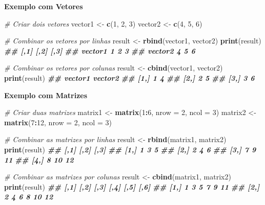 \documentclass[
]{book}
\newenvironment{Shaded}{\begin{snugshade}}{\end{snugshade}}
\newcommand{\AttributeTok}[1]{\textcolor[rgb]{0.13,0.29,0.53}{#1}}
\newcommand{\CommentTok}[1]{\textcolor[rgb]{0.56,0.35,0.01}{\textit{#1}}}
\newcommand{\DecValTok}[1]{\textcolor[rgb]{0.00,0.00,0.81}{#1}}
\newcommand{\DocumentationTok}[1]{\textcolor[rgb]{0.56,0.35,0.01}{\textbf{\textit{#1}}}}
\newcommand{\FunctionTok}[1]{\textcolor[rgb]{0.13,0.29,0.53}{\textbf{#1}}}
\newcommand{\NormalTok}[1]{#1}
\newcommand{\OtherTok}[1]{\textcolor[rgb]{0.56,0.35,0.01}{#1}}
\newcommand{\SpecialCharTok}[1]{\textcolor[rgb]{0.81,0.36,0.00}{\textbf{#1}}}
\begin{document}
\textbf{Exemplo com Vetores}

\begin{Shaded}
\begin{Highlighting}[]
\CommentTok{\# Criar dois vetores}
\NormalTok{vector1 }\OtherTok{\textless{}{-}} \FunctionTok{c}\NormalTok{(}\DecValTok{1}\NormalTok{, }\DecValTok{2}\NormalTok{, }\DecValTok{3}\NormalTok{)}
\NormalTok{vector2 }\OtherTok{\textless{}{-}} \FunctionTok{c}\NormalTok{(}\DecValTok{4}\NormalTok{, }\DecValTok{5}\NormalTok{, }\DecValTok{6}\NormalTok{)}

\CommentTok{\# Combinar os vetores por linhas}
\NormalTok{result }\OtherTok{\textless{}{-}} \FunctionTok{rbind}\NormalTok{(vector1, vector2)}
\FunctionTok{print}\NormalTok{(result)}
\DocumentationTok{\#\#         [,1] [,2] [,3]}
\DocumentationTok{\#\# vector1    1    2    3}
\DocumentationTok{\#\# vector2    4    5    6}

\CommentTok{\# Combinar os vetores por colunas}
\NormalTok{result }\OtherTok{\textless{}{-}} \FunctionTok{cbind}\NormalTok{(vector1, vector2)}
\FunctionTok{print}\NormalTok{(result)}
\DocumentationTok{\#\#      vector1 vector2}
\DocumentationTok{\#\# [1,]       1       4}
\DocumentationTok{\#\# [2,]       2       5}
\DocumentationTok{\#\# [3,]       3       6}
\end{Highlighting}
\end{Shaded}

\textbf{Exemplo com Matrizes}

\begin{Shaded}
\begin{Highlighting}[]
\CommentTok{\# Criar duas matrizes}
\NormalTok{matrix1 }\OtherTok{\textless{}{-}} \FunctionTok{matrix}\NormalTok{(}\DecValTok{1}\SpecialCharTok{:}\DecValTok{6}\NormalTok{, }\AttributeTok{nrow =} \DecValTok{2}\NormalTok{, }\AttributeTok{ncol =} \DecValTok{3}\NormalTok{)}
\NormalTok{matrix2 }\OtherTok{\textless{}{-}} \FunctionTok{matrix}\NormalTok{(}\DecValTok{7}\SpecialCharTok{:}\DecValTok{12}\NormalTok{, }\AttributeTok{nrow =} \DecValTok{2}\NormalTok{, }\AttributeTok{ncol =} \DecValTok{3}\NormalTok{)}

\CommentTok{\# Combinar as matrizes por linhas}
\NormalTok{result }\OtherTok{\textless{}{-}} \FunctionTok{rbind}\NormalTok{(matrix1, matrix2)}
\FunctionTok{print}\NormalTok{(result)}
\DocumentationTok{\#\#      [,1] [,2] [,3]}
\DocumentationTok{\#\# [1,]    1    3    5}
\DocumentationTok{\#\# [2,]    2    4    6}
\DocumentationTok{\#\# [3,]    7    9   11}
\DocumentationTok{\#\# [4,]    8   10   12}

\CommentTok{\# Combinar as matrizes por colunas}
\NormalTok{result }\OtherTok{\textless{}{-}} \FunctionTok{cbind}\NormalTok{(matrix1, matrix2)}
\FunctionTok{print}\NormalTok{(result)}
\DocumentationTok{\#\#      [,1] [,2] [,3] [,4] [,5] [,6]}
\DocumentationTok{\#\# [1,]    1    3    5    7    9   11}
\DocumentationTok{\#\# [2,]    2    4    6    8   10   12}
\end{Highlighting}
\end{Shaded}
\end{document}
